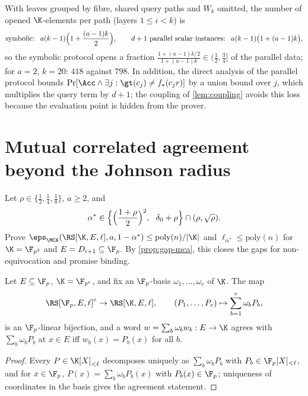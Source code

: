 \begin{remark}\label{rem:parallel}
With leaves grouped by fibre, shared query paths and $W_k$ omitted, the number of opened
$\K$-elements per path (layers $1\le i<k$) is
\[
\text{symbolic: }\ a(k-1)\Bigl(1+\frac{(a-1)k}2\Bigr),\qquad
\text{$d+1$ parallel scalar instances: }\ a(k-1)\bigl(1+(a-1)k\bigr),
\]
so the symbolic protocol opens a fraction
$\frac{1+(a-1)k/2}{1+(a-1)k}\in(\frac12,\frac34]$ of the parallel data; for $a=2$, $k=20$:
$418$ against $798$. In addition, the direct analysis of the parallel protocol bounds
$\Pr[\Acc\wedge\exists j:\gt(c_j)\ne f_\star(c_jr)]$ by a union bound over $j$, which
multiplies the query term by $d+1$; the coupling of \cref{lem:coupling} avoids this loss
because the evaluation point is hidden from the prover.
\end{remark}

\section{Mutual correlated agreement beyond the Johnson radius}

\begin{problem}\label{prob:mca-beyond}
Let $\rho\in\{\frac12,\frac14,\frac18\}$, $a\ge2$, and
\[
\alpha^\ast\in\Bigl\{\Bigl(\frac{1+\rho}2\Bigr)^2,\ \ \delta_0+\rho\Bigr\}\cap(\rho,\sqrt\rho).
\]
Prove $\eps_{\MCA}(\RS[\K,E,\ell],a,1-\alpha^\ast)\le\mathrm{poly}(n)/|\K|$ and
$\ell_{\alpha^\ast}\le\mathrm{poly}(n)$ for $\K=\F_{p^3}$ and $E=D_{i+1}\subseteq\F_p$.
By \cref{prop:gap-mca}, this closes the gaps for non-equivocation and promise binding.
\end{problem}

\begin{lemma}\label{lem:subfield-interleave}
Let $E\subseteq\F_p$, $\K=\F_{p^e}$, and fix an $\F_p$-basis $\omega_1,\dots,\omega_e$ of
$\K$. The map
\[
\RS[\F_p,E,\ell]^{e}\to\RS[\K,E,\ell],\qquad (P_1,\dots,P_e)\mapsto\sum_{b=1}^{e}\omega_bP_b,
\]
is an $\F_p$-linear bijection, and a word $w=\sum_b\omega_bw_b:E\to\K$ agrees with
$\sum_b\omega_bP_b$ at $x\in E$ iff $w_b(x)=P_b(x)$ for all $b$.
\end{lemma}

\begin{proof}
Every $P\in\K[X]_{<\ell}$ decomposes uniquely as $\sum_b\omega_bP_b$ with
$P_b\in\F_p[X]_{<\ell}$, and for $x\in\F_p$, $P(x)=\sum_b\omega_bP_b(x)$ with
$P_b(x)\in\F_p$; uniqueness of coordinates in the basis gives the agreement statement.
\end{proof}

